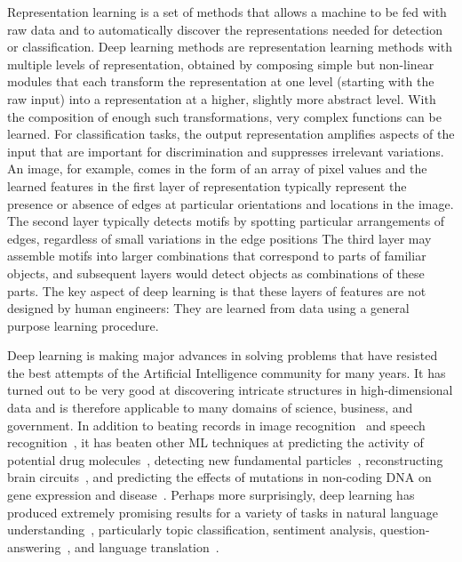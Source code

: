 \documentclass[10pts]{article}
\newcommand{\citep}[1]{\cite{#1}}
\begin{document}
Representation learning is a set of methods that allows a machine to be fed with
raw data and to automatically discover the representations needed for
detection or classification. Deep learning methods are representation
learning methods with multiple levels of representation, obtained
by composing simple but non-linear modules that each transform the representation at one level
(starting with the raw input) into a representation at a higher, slightly more 
abstract level. With the composition of enough such transformations, very complex functions
can be learned. For classification tasks, the output representation
amplifies aspects of the input that are important for discrimination
and suppresses irrelevant variations. An image, for example, comes in the form of an array of
pixel values and the learned features in the first layer of representation
typically represent the presence
or absence of edges at  particular orientations and locations in
the image. The second layer typically detects motifs by spotting particular
arrangements of edges, regardless of small variations in the edge positions
The third layer  may assemble motifs into larger
combinations that correspond to parts of familiar
objects, and subsequent layers would detect objects as combinations of
these parts. The key aspect of deep learning is that these layers of
features are not designed by human engineers: They are learned from
data using a general purpose learning procedure.

Deep learning is making major advances in solving problems that have
resisted the best attempts of the Artificial Intelligence community
for many years. It has turned out to be very good at discovering
intricate structures in high-dimensional data and is therefore
applicable to many domains of science, business, and government. In
addition to beating records in image
recognition~\citep{Krizhevsky-2012-small,farabet-pami-13,tompson-nips-14,szegedy-2014}
and speech
recognition~\citep{Mikolov-ASRU-2011,Hinton-et-al-2012,Sainath-et-al-ICASSP2013}, it has
beaten other ML techniques at predicting the activity of potential
drug molecules~\citep{Ma-et-al-2015}, detecting new fundamental
particles~\citep{Ciodaro-et-al-2012,Melis-Higgs-boson-competition-2014},
reconstructing brain circuits~\citep{helmstaedter-nature-2013}, and
predicting the effects of mutations in non-coding DNA on gene
expression and disease~\citep{Keung-et-al-2014,Xiong-et-al-Frey-science2015}.
Perhaps more surprisingly, deep learning has produced extremely
promising results for a variety of tasks in natural language
understanding~\citep{collobert:2011b}, particularly topic
classification, %
sentiment
analysis,%
question-answering~\cite{Bordes-et-al-EMNLP2014}, and language
translation~\cite{Jean-et-al-ACL2015,Sutskever-et-al-NIPS2014}.
\end{document}
